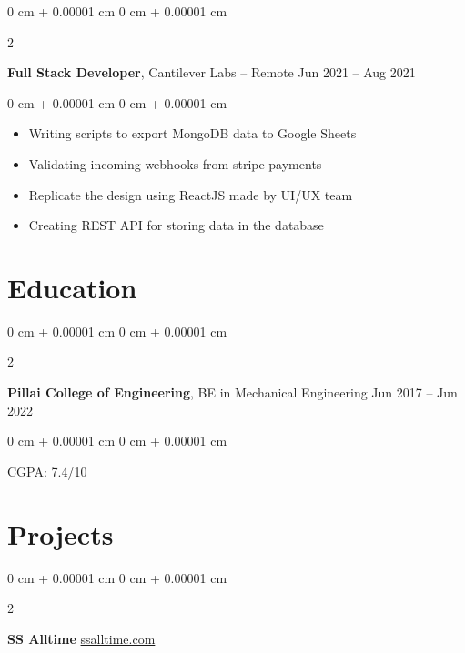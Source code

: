 \documentclass[10pt, letterpaper]{article}
\newenvironment{highlights}{
    \begin{itemize}[
        topsep=0.10 cm,
        parsep=0.10 cm,
        partopsep=0pt,
        itemsep=0pt,
        leftmargin=0 cm + 10pt
    ]
}{
    \end{itemize}
} %
\newenvironment{onecolentry}{
    \begin{adjustwidth}{
        0 cm + 0.00001 cm
    }{
        0 cm + 0.00001 cm
    }
}{
    \end{adjustwidth}
} %
\newenvironment{twocolentry}[2][]{
    \onecolentry
    \def\secondColumn{#2}
    \setcolumnwidth{\fill, 4.5 cm}
    \begin{paracol}{2}
}{
    \switchcolumn \raggedleft \secondColumn
    \end{paracol}
    \endonecolentry
} %
\begin{document}
        
        \begin{twocolentry}{
            Jun 2021 – Aug 2021
        }
            \textbf{Full Stack Developer}, Cantilever Labs -- Remote\end{twocolentry}

        \vspace{0.10 cm}
        \begin{onecolentry}
            \begin{highlights}
                \item Writing scripts to export MongoDB data to Google Sheets
                \item Validating incoming webhooks from stripe payments
                \item Replicate the design using ReactJS made by UI/UX team 
                \item Creating REST API for storing data in the database
            \end{highlights}
        \end{onecolentry}


        \vspace{0.2 cm}

    \section{Education}



        
        \begin{twocolentry}{
            Jun 2017 – Jun 2022
        }
            \textbf{Pillai College of Engineering}, BE in Mechanical Engineering\end{twocolentry}

        \vspace{0.10 cm}
        \begin{onecolentry}

            CGPA: 7.4/10

        \end{onecolentry}
        \vspace{0.20 cm}




    

    \section{Projects}



        
        \begin{twocolentry}{
            \href{https://ssalltime.com}{ssalltime.com}
        }
            \textbf{SS Alltime}\end{twocolentry}
\end{document}
